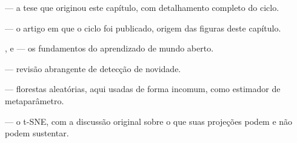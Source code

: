 \begin{leituras}
\item \citet{LopesTese2025} --- a tese que originou este capítulo, com detalhamento
      completo do ciclo.
\item \citet{Lopes2025EAAI} --- o artigo em que o ciclo foi publicado, origem das
      figuras deste capítulo.
\item \citet{openworld1}, \citet{openworld2} e \citet{openworld3} --- os fundamentos do
      aprendizado de mundo aberto.
\item \citet{Pimentel2014review} --- revisão abrangente de detecção de novidade.
\item \citet{Breiman2001} --- florestas aleatórias, aqui usadas de forma incomum, como
      estimador de metaparâmetro.
\item \citet{maaten2008visualizing} --- o t-SNE, com a discussão original sobre o que
      suas projeções podem e não podem sustentar.
\end{leituras}
